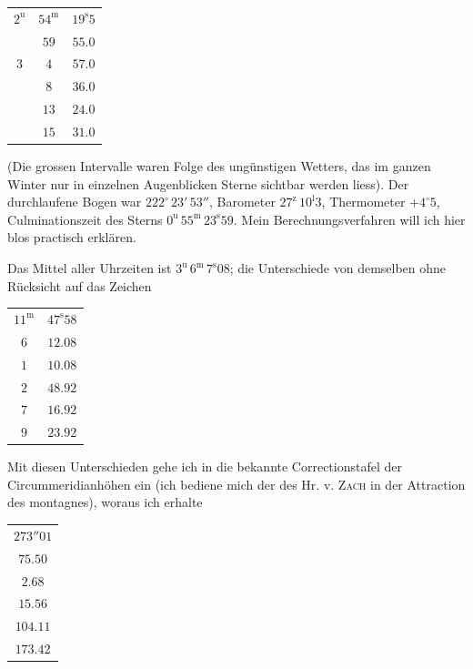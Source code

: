 \begin{center}\fontsize{10}{12}\selectfont\setlength{\tabcolsep}{3pt}\begin{tabular}{ccc}
$2^{\mathrm u}$ & $54^{\mathrm m}$ & $19^{\mathrm s}5$\\
 & $59$ & $55.0$\\
$3$ & $4$ & $57.0$\\
 & $8$ & $36.0$\\
 & $13$ & $24.0$\\
 & $15$ & $31.0$\\
\end{tabular}\end{center}

\par\indent (Die grossen Intervalle waren Folge des ungünstigen Wetters, das im ganzen Winter nur in einzelnen Augenblicken Sterne sichtbar werden liess). Der durchlaufene Bogen war $222^\circ\,23'\,53''$, Barometer $27^{\mathrm z}\,10^{\mathrm l}3$, Thermometer $+4^\circ5$, Culminationszeit des Sterns $0^{\mathrm u}\,55^{\mathrm m}\,23^{\mathrm s}59$. Mein Berechnungsverfahren will ich hier blos practisch erklären.

\par\indent Das Mittel aller Uhrzeiten ist $3^{\mathrm u}\,6^{\mathrm m}\,7^{\mathrm s}08$; die Unterschiede von demselben ohne Rücksicht auf das Zeichen

\begin{center}\fontsize{10}{12}\selectfont\setlength{\tabcolsep}{3pt}\begin{tabular}{cc}
$11^{\mathrm m}$ & $47^{\mathrm s}58$\\
$6$ & $12.08$\\
$1$ & $10.08$\\
$2$ & $48.92$\\
$7$ & $16.92$\\
$9$ & $23.92$\\
\end{tabular}\end{center}

\par\indent Mit diesen Unterschieden gehe ich in die bekannte Correctionstafel der Circummeridianhöhen ein (ich bediene mich der des Hr. v. \textsc{Zach} in der Attraction des montagnes), woraus ich erhalte

\begin{center}\fontsize{10}{12}\selectfont\setlength{\tabcolsep}{3pt}\begin{tabular}{c}
$273''01$\\
$75.50$\\
$2.68$\\
$15.56$\\
$104.11$\\
$173.42$\\
\end{tabular}\end{center}

